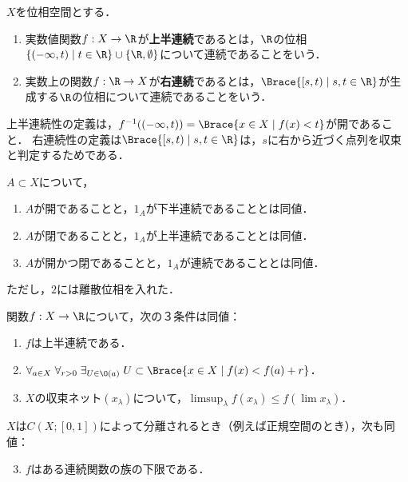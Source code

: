 \documentclass[uplatex,dvipdfmx]{jsreport}
\begin{document}
\begin{definition}
    $X$を位相空間とする．
    \begin{enumerate}
        \item 実数値関数$f:X\to\R$が\textbf{上半連続}であるとは，$\R$の位相$\{(-\infty,t)\mid t\in\R\}\cup\{\R,\emptyset\}$について連続であることをいう．
        \item 実数上の関数$f:\R\to X$が\textbf{右連続}であるとは，$\Brace{[s,t)\mid s,t\in\R}$が生成する$\R$の位相について連続であることをいう．
    \end{enumerate}
\end{definition}
\begin{remark}
    上半連続性の定義は，$f^{-1}((-\infty,t))=\Brace{x\in X\mid f(x)<t}$が開であること．
    右連続性の定義は$\Brace{[s,t)\mid s,t\in\R}$は，$s$に右から近づく点列を収束と判定するためである．
\end{remark}

\begin{proposition}[特性関数の連続性]
    $A\subset X$について，
    \begin{enumerate}
        \item $A$が開であることと，$1_A$が下半連続であることとは同値．
        \item $A$が閉であることと，$1_A$が上半連続であることとは同値．
        \item $A$が開かつ閉であることと，$1_A$が連続であることとは同値．
    \end{enumerate}
    ただし，$2$には離散位相を入れた．
\end{proposition}

\begin{proposition}[上半連続性の特徴付け]
    関数$f:X\to\R$について，次の３条件は同値：
    \begin{enumerate}
        \item $f$は上半連続である．
        \item $\forall_{a\in X}\;\forall_{r>0}\;\exists_{U\in\O(a)}\;U\subset\Brace{x\in X\mid f(x)<f(a)+r}$．
        \item $X$の収束ネット$(x_\lambda)$について，$\limsup_\lambda f(x_\lambda)\le f(\lim x_\lambda)$．
    \end{enumerate}
    $X$は$C(X;[0,1])$によって分離されるとき（例えば正規空間のとき），次も同値：
    \begin{enumerate}\setcounter{enumi}{2}
        \item $f$はある連続関数の族の下限である．
    \end{enumerate}
\end{proposition}
\end{document}

